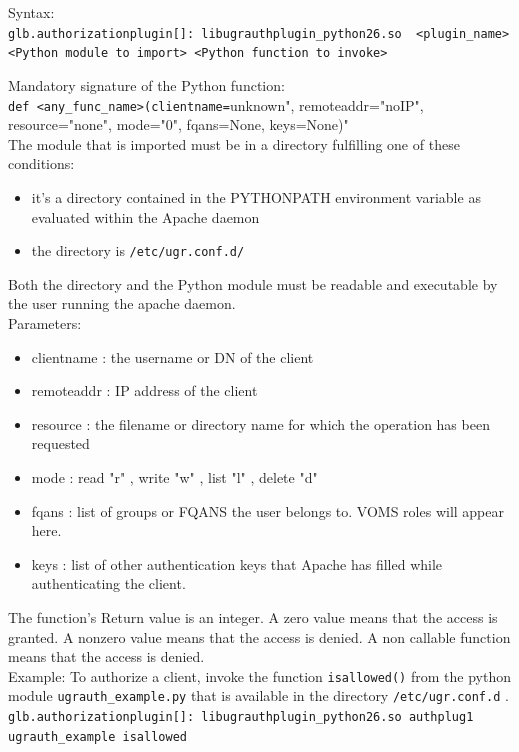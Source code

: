 \documentclass[12pt]{article} %
\begin{document}
Syntax:\\
\lstinline"glb.authorizationplugin[]: libugrauthplugin_python26.so  <plugin_name>  <Python module to import> <Python function to invoke>"

Mandatory signature of the Python function:\\
\lstinline"def <any_func_name>(clientname="unknown", remoteaddr="noIP", resource="none", mode="0", fqans=None, keys=None)"\\

The module that is imported must be in a directory fulfilling one of these conditions:\\
\begin{itemize}
 \item it's a directory contained in the PYTHONPATH environment variable as evaluated within the Apache daemon
 \item the directory is \lstinline"/etc/ugr.conf.d/"
\end{itemize}
Both the directory and the Python module must be readable and executable by the user running the apache daemon.\\

Parameters:\\
\begin{itemize}
 \item clientname : the username or DN of the client
 \item remoteaddr : IP address of the client
 \item resource : the filename or directory name for which the operation has been requested
 \item mode : read "r" , write "w" , list "l" , delete "d"
 \item fqans : list of groups or FQANS the user belongs to. VOMS roles will appear here.
 \item keys : list of other authentication keys that Apache has filled while authenticating the client.
\end{itemize}

The function's Return value is an integer. A zero value means that the access is granted. A nonzero value means that the access is denied.
A non callable function means that the access is denied.\\

Example:
To authorize a client, invoke the function \lstinline"isallowed()" from the python module \lstinline"ugrauth_example.py" that is available in the directory \lstinline"/etc/ugr.conf.d" .\\
\lstinline"glb.authorizationplugin[]: libugrauthplugin_python26.so authplug1 ugrauth_example isallowed"\\
\end{document}
